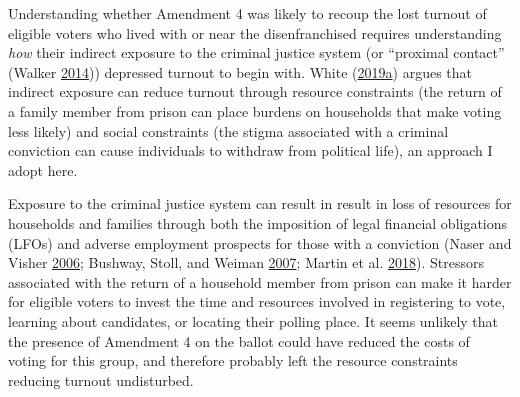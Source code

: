 \documentclass[
  12pt,
]{article}
\begin{document}
Understanding whether Amendment 4 was likely to recoup the lost turnout of eligible voters who lived with or near the disenfranchised requires understanding \emph{how} their indirect exposure to the criminal justice system (or ``proximal contact'' (Walker \protect\hyperlink{ref-Walker2014}{2014})) depressed turnout to begin with. White (\protect\hyperlink{ref-White2019a}{2019}\protect\hyperlink{ref-White2019a}{a}) argues that indirect exposure can reduce turnout through resource constraints (the return of a family member from prison can place burdens on households that make voting less likely) and social constraints (the stigma associated with a criminal conviction can cause individuals to withdraw from political life), an approach I adopt here.

Exposure to the criminal justice system can result in result in loss of resources for households and families through both the imposition of legal financial obligations (LFOs) and adverse employment prospects for those with a conviction (Naser and Visher \protect\hyperlink{ref-Naser2006}{2006}; Bushway, Stoll, and Weiman \protect\hyperlink{ref-Bushway2007}{2007}; Martin et al. \protect\hyperlink{ref-Martin2018}{2018}). Stressors associated with the return of a household member from prison can make it harder for eligible voters to invest the time and resources involved in registering to vote, learning about candidates, or locating their polling place. It seems unlikely that the presence of Amendment 4 on the ballot could have reduced the costs of voting for this group, and therefore probably left the resource constraints reducing turnout undisturbed.
\end{document}

